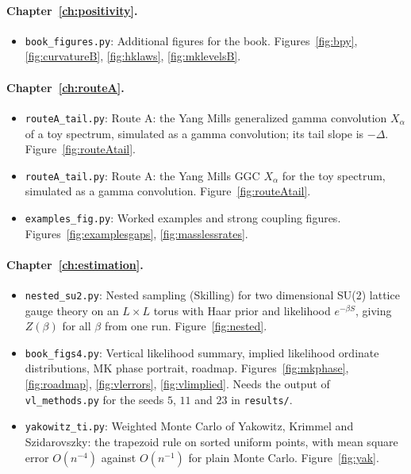 \paragraph{Chapter~\ref{ch:positivity}.}\nopagebreak
\begin{itemize}\setlength{\itemsep}{0pt}\setlength{\parskip}{0pt}
\item \texttt{book\_figures.py}: Additional figures for the book. Figures~\ref{fig:bpy}, \ref{fig:curvatureB}, \ref{fig:hklaws}, \ref{fig:mklevelsB}.
\end{itemize}
\paragraph{Chapter~\ref{ch:routeA}.}\nopagebreak
\begin{itemize}\setlength{\itemsep}{0pt}\setlength{\parskip}{0pt}
\item \texttt{routeA\_tail.py}: Route A: the Yang Mills generalized gamma convolution $X_\alpha$ of a toy spectrum, simulated as a gamma convolution; its tail slope is $-\Delta$. Figure~\ref{fig:routeAtail}.
\item \texttt{routeA\_tail.py}: Route A: the Yang Mills GGC $X_\alpha$ for the toy spectrum, simulated as a gamma convolution. Figure~\ref{fig:routeAtail}.
\item \texttt{examples\_fig.py}: Worked examples and strong coupling figures. Figures~\ref{fig:examplesgaps}, \ref{fig:masslessrates}.
\end{itemize}
\paragraph{Chapter~\ref{ch:estimation}.}\nopagebreak
\begin{itemize}\setlength{\itemsep}{0pt}\setlength{\parskip}{0pt}
\item \texttt{nested\_su2.py}: Nested sampling (Skilling) for two dimensional SU(2) lattice gauge theory on an $L\times L$ torus with Haar prior and likelihood $e^{-\beta S}$, giving $Z(\beta)$ for all $\beta$ from one run. Figure~\ref{fig:nested}.
\item \texttt{book\_figs4.py}: Vertical likelihood summary, implied likelihood ordinate distributions, MK phase portrait, roadmap. Figures~\ref{fig:mkphase}, \ref{fig:roadmap}, \ref{fig:vlerrors}, \ref{fig:vlimplied}. Needs the output of \texttt{vl\_methods.py} for the seeds $5$, $11$ and $23$ in \texttt{results/}.
\item \texttt{yakowitz\_ti.py}: Weighted Monte Carlo of Yakowitz, Krimmel and Szidarovszky: the trapezoid rule on sorted uniform points, with mean square error $O(n^{-4})$ against $O(n^{-1})$ for plain Monte Carlo. Figure~\ref{fig:yak}.
\end{itemize}
